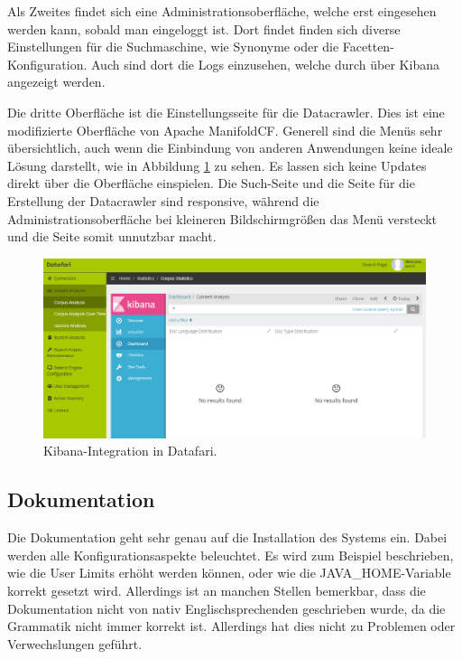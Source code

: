 Als Zweites findet sich eine Administrationsoberfläche, welche erst eingesehen werden kann, sobald man eingeloggt ist. Dort findet finden sich diverse Einstellungen für die Suchmaschine, wie Synonyme oder die Facetten-Konfiguration. Auch sind dort die Logs einzusehen, welche durch über Kibana angezeigt werden. 

Die dritte Oberfläche ist die Einstellungsseite für die Datacrawler. Dies ist eine modifizierte Oberfläche von Apache ManifoldCF. Generell sind die Menüs sehr übersichtlich, auch wenn die Einbindung von anderen Anwendungen keine ideale Lösung darstellt, wie in Abbildung \ref{img:datafariKibana} zu sehen. Es lassen sich keine Updates direkt über die Oberfläche einspielen.
Die Such-Seite und die Seite für die Erstellung der Datacrawler sind responsive, während die Administrationsoberfläche bei kleineren Bildschirmgrößen das Menü versteckt und die Seite somit unnutzbar macht.

\begin{figure}
	\centering
	\includegraphics[width=1\linewidth]{images/datafari_kibana.png}
	\caption{Kibana-Integration in Datafari.}
	\label{img:datafariKibana}
\end{figure}

\subsection{Dokumentation}

Die Dokumentation geht sehr genau auf die Installation des Systems ein. Dabei werden alle Konfigurationsaspekte beleuchtet. Es wird zum Beispiel beschrieben, wie die User Limits erhöht werden können, oder wie die JAVA\_HOME-Variable korrekt gesetzt wird. Allerdings ist an manchen Stellen bemerkbar, dass die Dokumentation nicht von nativ Englischsprechenden geschrieben wurde, da die Grammatik nicht immer korrekt ist. Allerdings hat dies nicht zu Problemen oder Verwechslungen geführt.

